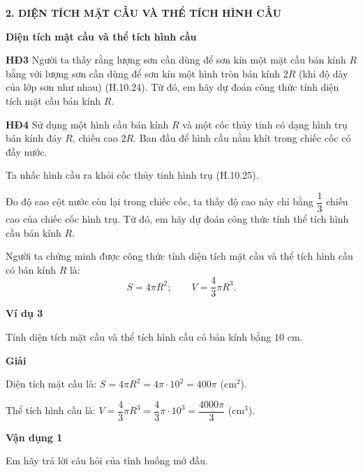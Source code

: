 \begin{lesson}
    \answerline
    \answerline

    \textbf{2. DIỆN TÍCH MẶT CẦU VÀ THỂ TÍCH HÌNH CẦU}

    \textbf{Diện tích mặt cầu và thể tích hình cầu}

    \textbf{HĐ3} Người ta thấy rằng lượng sơn cần dùng để sơn kín một mặt cầu bán kính $R$ bằng với lượng sơn cần dùng để sơn kín một hình tròn bán kính $2R$ (khi độ dày của lớp sơn như nhau) (H.10.24). Từ đó, em hãy dự đoán công thức tính diện tích mặt cầu bán kính $R$.


    \answerline
    \answerline

    \textbf{HĐ4} Sử dụng một hình cầu bán kính $R$ và một cốc thủy tinh có dạng hình trụ bán kính đáy $R$, chiều cao $2R$. Ban đầu để hình cầu nằm khít trong chiếc cốc có đầy nước.

    Ta nhấc hình cầu ra khỏi cốc thủy tinh hình trụ (H.10.25).


    Đo độ cao cột nước còn lại trong chiếc cốc, ta thấy độ cao này chỉ bằng $\dfrac{1}{3}$ chiều cao của chiếc cốc hình trụ. Từ đó, em hãy dự đoán công thức tính thể tích hình cầu bán kính $R$.

    \answerline
    \answerline
    \answerline

    \begin{keyconcept}
        Người ta chứng minh được công thức tính diện tích mặt cầu và thể tích hình cầu có bán kính $R$ là:
        \[
            S=4\pi R^2;\qquad V=\dfrac{4}{3}\pi R^3.
        \]
    \end{keyconcept}

    \textbf{Ví dụ 3}

    Tính diện tích mặt cầu và thể tích hình cầu có bán kính bằng $10$ cm.

    \textbf{Giải}

    Diện tích mặt cầu là: $S=4\pi R^2=4\pi\cdot 10^2=400\pi$ (cm$^2$).

    Thể tích hình cầu là: $V=\dfrac{4}{3}\pi R^3=\dfrac{4}{3}\pi\cdot 10^3=\dfrac{4000\pi}{3}$ (cm$^3$).

    \textbf{Vận dụng 1}

    Em hãy trả lời câu hỏi của tình huống mở đầu.

    \answerline
    \answerline
    \answerline


\end{lesson}
